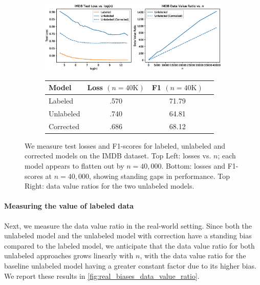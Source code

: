 \begin{figure}
    \centering
    \begin{subfigure}{.48\textwidth}
      \centering
      \includegraphics[width=\linewidth]{eps_figures/real_biases_data_value_ratio.eps}
    \end{subfigure}
    \begin{subfigure}{.48\textwidth}
      \small
      \centering
      {\renewcommand{\arraystretch}{1.2}
      \begin{tabular}{lccr}
      \hline
      Model & Loss $(n=40\text{K})$ & F1 $(n=40\text{K})$ \\
      \hline
      Labeled & .570 & 71.79 \\
      Unlabeled & .740 & 64.81 \\
      Corrected & .686 & 68.12 \\
      \hline
      \end{tabular}
      }
    \end{subfigure}
    \caption{We measure test losses and F1-scores for labeled, unlabeled and corrected models on the IMDB dataset. Top Left: losses vs. $n$; each model appears to flatten out by $n=40,000$.  Bottom: losses and F1-scores at $n=40,000$, showing standing gaps in performance. Top Right: data value ratios for the two unlabeled models.}
    \label{fig:real_biases_data_value_ratio}
\end{figure}

\vspace{-0.5em}
\paragraph{Measuring the value of labeled data} Next, we measure the data value ratio in the real-world setting. Since both the unlabeled model and the unlabeled model with correction have a standing bias compared to the labeled model, we anticipate that the data value ratio for both unlabeled approaches grows linearly with $n$, with the data value ratio for the baseline unlabeled model having a greater constant factor due to its higher bias. We report these results in \autoref{fig:real_biases_data_value_ratio}.

